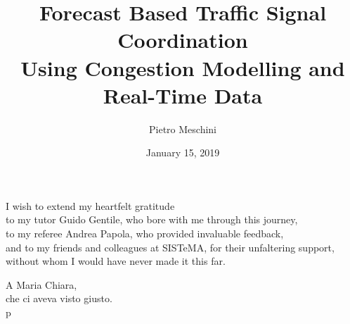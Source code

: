 \documentclass[11pt,a4paper,twoside]{book}
\author{Pietro Meschini}
\title{Forecast Based Traffic Signal Coordination\\ Using Congestion Modelling and Real-Time Data}
\date{January 15, 2019}
\begin{document}
\frontmatter
\maketitle

\begin{dedica}
	I wish to extend my heartfelt gratitude\\
	to my tutor Guido Gentile, who bore with me through this journey,\\
	to my referee Andrea Papola, who provided invaluable feedback,\\
	and to my friends and colleagues at SISTeMA, for their unfaltering support,\\
	without whom I would have never made it this far.
    \par   %
    \vspace{2\baselineskip}
    \Large
	A Maria Chiara,\\
	che ci aveva visto giusto.\\
    \vspace{\baselineskip}
    p
\end{dedica}



\tableofcontents



\mainmatter




 






%

%





\nocite{*}



\appendix

\end{document}
